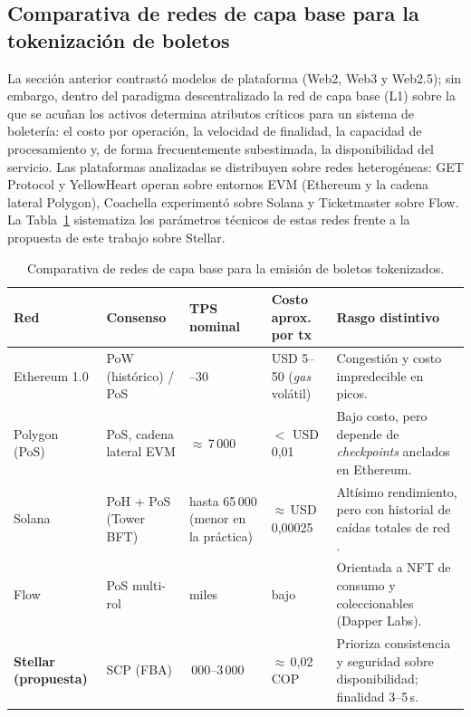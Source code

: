 \subsection{Comparativa de redes de capa base para la tokenización de boletos}

La sección anterior contrastó modelos de plataforma (Web2, Web3 y Web2.5); sin embargo, dentro del
paradigma descentralizado la red de capa base (L1) sobre la que se acuñan los activos determina atributos
críticos para un sistema de boletería: el costo por operación, la velocidad de finalidad, la capacidad de
procesamiento y, de forma frecuentemente subestimada, la disponibilidad del servicio. Las plataformas
analizadas se distribuyen sobre redes heterogéneas: GET Protocol y YellowHeart operan sobre entornos
EVM (Ethereum y la cadena lateral Polygon), Coachella experimentó sobre Solana y Ticketmaster sobre Flow.
La Tabla~\ref{tab:comparativa-redes} sistematiza los parámetros técnicos de estas redes frente a la
propuesta de este trabajo sobre Stellar.

\begin{table}[H]
\centering
\small
\renewcommand{\arraystretch}{1.3}
\caption{Comparativa de redes de capa base para la emisión de boletos tokenizados.}
\label{tab:comparativa-redes}
\begin{tabularx}{\textwidth}{>{\raggedright\arraybackslash}p{2.4cm} >{\raggedright\arraybackslash}p{2.7cm}
>{\raggedright\arraybackslash}p{2.0cm} >{\raggedright\arraybackslash}p{2.2cm}
>{\raggedright\arraybackslash}X}
\toprule
\rowcolor{rowgray}
\textbf{Red} & \textbf{Consenso} & \textbf{TPS nominal} & \textbf{Costo aprox. por tx} & \textbf{Rasgo
distintivo} \\
\midrule
Ethereum 1.0 & PoW (histórico) / PoS & 15--30 & USD 5--50 (\textit{gas} volátil) & Congestión y costo
impredecible en picos. \\
\rowcolor{rowgray}
Polygon (PoS) & PoS, cadena lateral EVM & $\approx$\,7\,000 & $<$ USD 0{,}01 & Bajo costo, pero depende de
\textit{checkpoints} anclados en Ethereum. \\
Solana & PoH + PoS (Tower BFT) & hasta 65\,000 (menor en la práctica) & $\approx$\,USD 0{,}00025 & Altísimo
rendimiento, pero con historial de caídas totales de red \cite{helius2024solana}. \\
\rowcolor{rowgray}
Flow & PoS multi-rol & miles & bajo & Orientada a NFT de consumo y coleccionables (Dapper Labs). \\
\textbf{Stellar (propuesta)} & SCP (FBA) & 1\,000--3\,000 & $\approx$\,0{,}02 COP & Prioriza consistencia y
seguridad sobre disponibilidad; finalidad 3--5\,s. \\
\bottomrule
\end{tabularx}
\end{table}

